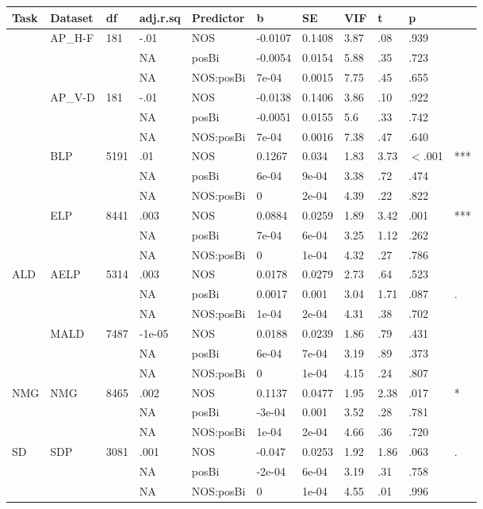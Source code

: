 \begin{table}[ht]
\centering
\begingroup\normalsize
\begin{tabular}{lllllllllll}
  \hline
Task & Dataset & df & adj.r.sq & Predictor & b & SE & VIF & t & p &  \\ 
  \hline
 & AP\_H-F & 181 & -.01 & NOS & -0.0107 & 0.1408 & 3.87 & .08 & .939 &   \\ 
   &  &  & NA & posBi & -0.0054 & 0.0154 & 5.88 & .35 & .723 &   \\ 
   &  &  & NA & NOS:posBi & 7e-04 & 0.0015 & 7.75 & .45 & .655 &   \\ 
   & AP\_V-D & 181 & -.01 & NOS & -0.0138 & 0.1406 & 3.86 & .10 & .922 &   \\ 
   &  &  & NA & posBi & -0.0051 & 0.0155 & 5.6 & .33 & .742 &   \\ 
   &  &  & NA & NOS:posBi & 7e-04 & 0.0016 & 7.38 & .47 & .640 &   \\ 
   & BLP & 5191 & .01 & NOS & 0.1267 & 0.034 & 1.83 & 3.73 & $<$.001 & *** \\ 
   &  &  & NA & posBi & 6e-04 & 9e-04 & 3.38 & .72 & .474 &   \\ 
   &  &  & NA & NOS:posBi & 0 & 2e-04 & 4.39 & .22 & .822 &   \\ 
   & ELP & 8441 & .003 & NOS & 0.0884 & 0.0259 & 1.89 & 3.42 & .001 & *** \\ 
   &  &  & NA & posBi & 7e-04 & 6e-04 & 3.25 & 1.12 & .262 &   \\ 
   &  &  & NA & NOS:posBi & 0 & 1e-04 & 4.32 & .27 & .786 &   \\ 
  ALD & AELP & 5314 & .003 & NOS & 0.0178 & 0.0279 & 2.73 & .64 & .523 &   \\ 
   &  &  & NA & posBi & 0.0017 & 0.001 & 3.04 & 1.71 & .087 & . \\ 
   &  &  & NA & NOS:posBi & 1e-04 & 2e-04 & 4.31 & .38 & .702 &   \\ 
   & MALD & 7487 & -1e-05 & NOS & 0.0188 & 0.0239 & 1.86 & .79 & .431 &   \\ 
   &  &  & NA & posBi & 6e-04 & 7e-04 & 3.19 & .89 & .373 &   \\ 
   &  &  & NA & NOS:posBi & 0 & 1e-04 & 4.15 & .24 & .807 &   \\ 
  NMG & NMG & 8465 & .002 & NOS & 0.1137 & 0.0477 & 1.95 & 2.38 & .017 & * \\ 
   &  &  & NA & posBi & -3e-04 & 0.001 & 3.52 & .28 & .781 &   \\ 
   &  &  & NA & NOS:posBi & 1e-04 & 2e-04 & 4.66 & .36 & .720 &   \\ 
  SD & SDP & 3081 & .001 & NOS & -0.047 & 0.0253 & 1.92 & 1.86 & .063 & . \\ 
   &  &  & NA & posBi & -2e-04 & 6e-04 & 3.19 & .31 & .758 &   \\ 
   &  &  & NA & NOS:posBi & 0 & 1e-04 & 4.55 & .01 & .996 &   \\ 
   \hline
\end{tabular}
\endgroup
\end{table}
